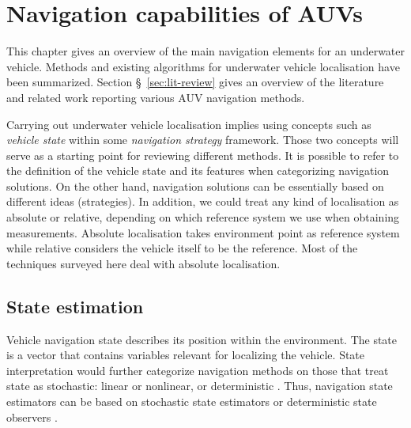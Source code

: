 \chapter{Navigation capabilities of AUVs} \label{chap:capabilities}
This chapter gives an overview of the main navigation elements for an underwater vehicle. Methods and existing algorithms for underwater vehicle localisation have been summarized. Section \S~\ref{sec:lit-review}  gives an overview of the literature and related work reporting various AUV navigation methods. 

Carrying out underwater vehicle localisation implies using concepts such as \textit{vehicle state} within some \textit{navigation strategy} framework. Those two concepts will serve as a starting point for reviewing different methods. It is possible to refer to the definition of the vehicle state and its features when categorizing navigation solutions. On the other hand, navigation solutions can be essentially based on different ideas (strategies). In addition, we could treat any kind of localisation as absolute or relative, depending on which reference system we use when obtaining measurements. Absolute localisation takes environment point as reference system while relative considers the vehicle itself to be the reference. Most of the techniques surveyed here deal with absolute localisation. 
\section{State estimation}
Vehicle navigation state describes its position within the environment. The state is a vector that contains variables relevant for localizing the vehicle. State interpretation would further categorize navigation methods on those that treat state as stochastic: linear or nonlinear, or deterministic \cite{kinsey06}. Thus, navigation state estimators can be based on stochastic state estimators or deterministic state observers \cite{kinsey06}.
